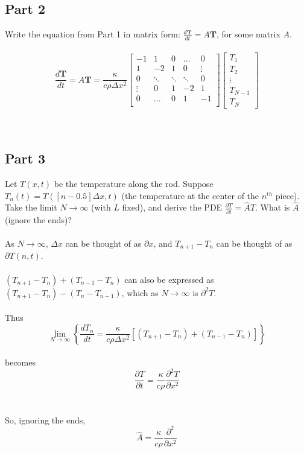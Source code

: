 \documentclass{amsart}
\begin{document}
	\subsection{Part 2}
	Write the equation from Part 1 in matrix form: $\frac{d\mathbf{T}}{dt} = A\mathbf{T}$, for some matrix $A$.
	\\\\
	\[\frac{d\mathbf{T}}{dt}=A\mathbf{T} = \frac{\kappa}{c\rho\Delta x^2}
	\begin{bmatrix}
		-1     & 1    & 0    &\dots & 0 \\
		 1     & -2   & 1    & 0    & \vdots \\
		 0     &\ddots&\ddots&\ddots& 0 \\
		 \vdots&  0   &   1  &  -2  & 1\\
		 0     &\dots &  0   &   1  & -1 \\
	\end{bmatrix}
	\begin{bmatrix}
		T_1\\T_2\\ \vdots \\ T_{N-1} \\ T_N
	\end{bmatrix}
	\]\\\\
	
	\subsection{Part 3}
	Let $T(x,t)$ be the temperature along the rod. Suppose $T_n(t) = T([n-0.5]\Delta x,t)$ (the temperature at the center of the $n^{th}$ piece). Take the limit $N \rightarrow \infty$ (with $L$ fixed), and derive the PDE $\frac{\partial T}{\partial t}= \hat{A}T$. What is $\hat{A}$ (ignore the ends)?
	\\\\
	As $N\rightarrow\infty$, $\Delta x$ can be thought of as $\partial x$, and $T_{n+1} - T_n$ can be thought of as $\partial T(n,t)$.
	\\\\
	$(T_{n+1}-T_n) + (T_{n-1}-T_n)$ can also be expressed as  $(T_{n+1}-T_n) - (T_{n}-T_{n-1})$, which as $N \rightarrow \infty$ is $\partial^2T$.
	\\\\
	Thus
	\[ \lim\limits_{N \rightarrow \infty} \left\{ \frac{dT_n}{dt} = \frac{\kappa}{c\rho \Delta x^2}\left[ (T_{n+1}-T_n)+(T_{n-1}-T_n) \right] \right\}
	\]\\
	becomes
	\[\frac{\partial T}{\partial t} = \frac{\kappa}{c\rho}\frac{\partial^2T}{\partial x^2}
	\]
	\\\\
	So, ignoring the ends,
	\[\hat{A} = \frac{\kappa}{c\rho}\frac{\partial^2}{\partial x^2}
	\]\\
\end{document}
